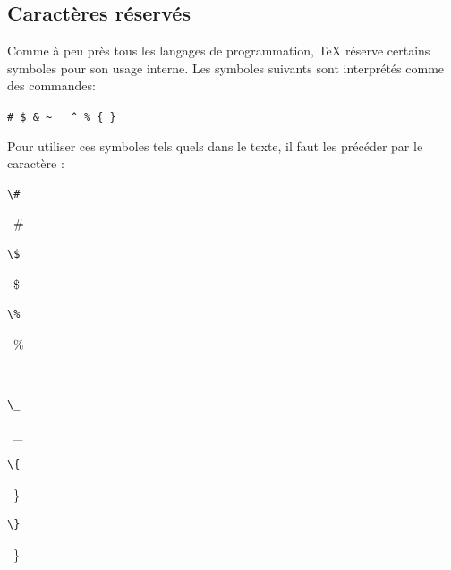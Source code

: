 \subsection{Caractères réservés}
\label{chap:bases:caracteres:reserves}

Comme à peu près tous les langages de programmation, {\TeX} réserve
certains symboles pour son usage interne. Les symboles suivants sont
interprétés comme des commandes:
\begin{center}
  \verb=# $ & ~ _ ^ % { }=
\end{center}
Pour utiliser ces symboles tels quels dans le texte, il faut les
précéder par le caractère {\bs}:
\begin{demo}
  \begin{minipage}{0.2\linewidth}
    \begin{texample}
\begin{lstlisting}
\#
\end{lstlisting}
      \producing\ \#
    \end{texample}
  \end{minipage}
  \hfill
  \begin{minipage}{0.2\linewidth}
    \begin{texample}
\begin{lstlisting}
\$
\end{lstlisting}
      \producing\ \$
    \end{texample}
  \end{minipage}
  \hfill
  \begin{minipage}{0.2\linewidth}
    \begin{texample}
\begin{lstlisting}[commentstyle=\mdseries]
\%
\end{lstlisting}
      \producing\ \%
    \end{texample}
  \end{minipage}
  \\
  \begin{minipage}{0.2\linewidth}
    \begin{texample}
\begin{lstlisting}
\_
\end{lstlisting}
      \producing\rule{0pt}{1em}\ \_
    \end{texample}
  \end{minipage}
  \hfill
  \begin{minipage}{0.2\linewidth}
    \begin{texample}
\begin{lstlisting}
\{
\end{lstlisting}
      \producing\ \}
    \end{texample}
  \end{minipage}
  \hfill
  \begin{minipage}{0.2\linewidth}
    \begin{texample}
\begin{lstlisting}
\}
\end{lstlisting}
      \producing\ \}
    \end{texample}
  \end{minipage}
\end{demo}


